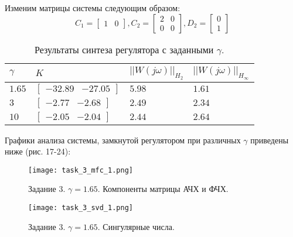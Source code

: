 Изменим матрицы системы следующим образом:
\begin{equation*}
    C_1 = \begin{bmatrix}
        1 & 0
    \end{bmatrix},
    C_2 = \begin{bmatrix}
        2 & 0 \\ 0 & 0
    \end{bmatrix},
    D_2 = \begin{bmatrix}
        0 \\ 1
    \end{bmatrix}
\end{equation*}

\begin{table}[h!]
    \centering
    \begin{tabular}{| l | l | l | l |} 
        \hline
        $\gamma$ & $K$ & $||W(j\omega)||_{H_2}$ & $||W(j\omega)||_{H_\infty}$ \\  
        \hline\hline
        $1.65$ & $\begin{bmatrix} -32.89 & -27.05 \end{bmatrix}$ & $5.98$ & $1.61$ \\ 
        \hline
        $3$ & $\begin{bmatrix} -2.77 & -2.68 \end{bmatrix}$ & $2.49$ & $2.34$ \\
        \hline
        $10$ & $\begin{bmatrix} -2.05 & -2.04 \end{bmatrix}$ & $2.44$ & $2.64$ \\
        \hline
       \end{tabular}
    \caption{Результаты синтеза регулятора с заданными $\gamma$.}
    \label{table:1}
\end{table}

Графики анализа системы, замкнутой регулятором при различных $\gamma$ приведены ниже (рис. 17-24):

\begin{figure}[]
    \centering
    \texttt{[image: task\_3\_mfc\_1.png]}
    \caption{\label{fig:task3_1_1}Задание 3. $\gamma = 1.65$. Компоненты матрицы АЧХ и ФЧХ.}
\end{figure}

\begin{figure}[]
    \centering
    \texttt{[image: task\_3\_svd\_1.png]}
    \caption{\label{fig:task3_1_2}Задание 3. $\gamma = 1.65$. Сингулярные числа.}
\end{figure}

